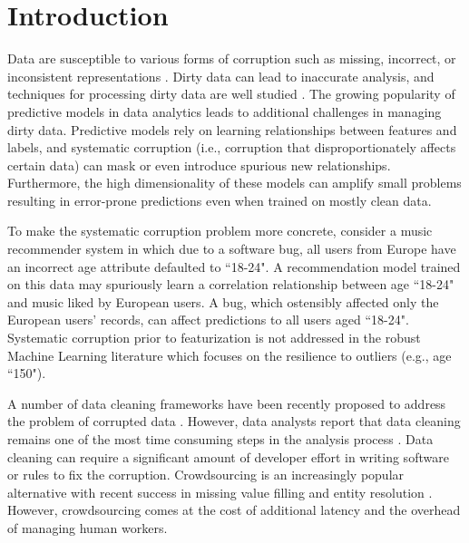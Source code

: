 \section{Introduction}
Data are susceptible to various forms of corruption such as missing, incorrect, or inconsistent representations \cite{Gartner}.
Dirty data can lead to inaccurate analysis, and techniques for processing dirty data are well studied \cite{rahm2000data}.
The growing popularity of predictive models in data analytics \cite{bdas, alexandrov2014stratosphere, crotty2014tupleware, hellerstein2012madlib} leads to additional challenges in managing dirty data.
Predictive models rely on learning relationships between features and labels, and systematic corruption \cite{taylor1982introduction} (i.e., corruption that disproportionately affects certain data) can mask or even introduce spurious new relationships.
Furthermore, the high dimensionality of these models can amplify small problems \cite{xiaofeature} resulting in error-prone predictions even when trained on mostly clean data.

To make the systematic corruption problem more concrete, consider a music recommender system in which due to a software bug, all users from Europe have an incorrect age attribute defaulted to ``18-24".
A recommendation model trained on this data may spuriously learn a correlation relationship between age ``18-24" and music liked by European users.
A bug, which ostensibly affected only the European users' records, can affect predictions to all users aged ``18-24".
Systematic corruption prior to featurization is not addressed in the robust Machine Learning literature which focuses on the resilience to outliers (e.g., age ``150").

A number of data cleaning frameworks have been recently proposed to address the problem of corrupted data \cite{khayyat2015bigdansing, chu2015katara, sampleclean}.
However, data analysts report that data cleaning remains one of the most time consuming steps in the analysis process \cite{nytimes}.
Data cleaning can require a significant amount of developer effort in writing software or rules to fix the corruption.
Crowdsourcing is an increasingly popular alternative with recent success in missing value filling and entity resolution \cite{gokhale2014corleone, park2014crowdfill, sampleclean,chu2015katara}.
However, crowdsourcing comes at the cost of additional latency and the overhead of managing human workers.

